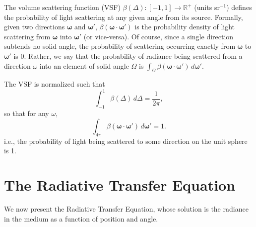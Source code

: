 \documentclass[ms,cpyr,lof,lot]{uathesis}
\newcommand\RR{\mathbb{R}}
\renewcommand\vec\bm
\begin{document}
The volume scattering function (VSF) $\beta(\Delta): [-1, 1] \to \RR^+$ (units sr$^{-1}$) defines the probability of light scattering at any given angle from its source.
Formally, given two directions $\vec{\omega}$ and $\vec{\omega}'$, $\beta(\vec{\omega} \cdot \vec{\omega}')$ is the probability density of light scattering from $\vec{\omega}$ into $\vec{\omega}'$ (or vice-versa).
Of course, since a single direction subtends no solid angle, the probability of scattering occurring exactly from $\vec{\omega}$ to $\vec{\omega}'$ is 0.
Rather, we say that the probability of radiance being scattered from a direction $\omega$ into an element of solid angle $\Omega$ is $\int_\Omega \beta(\vec{\omega} \cdot \vec{\omega}')\, d\vec{\omega}'$.

The VSF is normalized such that
\begin{equation*}
  \int_{-1}^1\beta(\Delta)\, d\Delta=\frac{1}{2\pi},
\end{equation*}
so that for any $\omega$,
\begin{equation*}
  \int_{4\pi}\beta(\vec{\omega}\cdot\vec{\omega}')\, d\vec{\omega}' = 1.
\end{equation*}
i.e., the probability of light being scattered to some direction on the unit sphere is 1.


\section{The Radiative Transfer Equation}
We now present the Radiative Transfer Equation, whose solution is the radiance in the medium as a function of position and angle.
\end{document}
